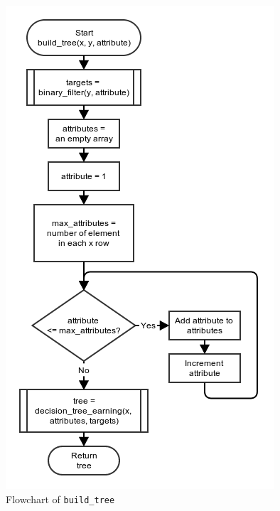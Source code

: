 \documentclass[10pt,a4paper]{article}
\begin{document}
\begin{figure}[!ht]
	\centering
	\includegraphics[scale=0.56]{images/flow_chart/build_tree.png}
	\caption{Flowchart of \tt{build\_tree}}
	\label{fig:build_tree}
\end{figure}
\end{document}
